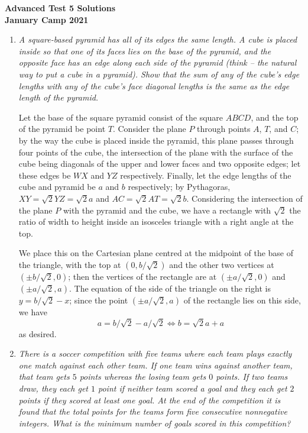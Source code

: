 \documentclass{article}
\begin{document}
\thispagestyle{empty}

\begin{center}
  \textbf{\Large Advanced Test 5 Solutions}
  \\ \vspace{1em}
  \textbf{\large January Camp 2021}
\end{center}

\vspace{12pt}

\begin{enumerate}[1.]

\item %
{\itshape A square-based pyramid has all of its edges the same length.
A cube is placed inside so that one of its faces lies on the base of the pyramid, and the opposite face has an edge along each side of the pyramid (think -- the natural way to put a cube in a pyramid).
Show that the sum of any of the cube's edge lengths with any of the cube's face diagonal lengths is the same as the edge length of the pyramid.}

Let the base of the square pyramid consist of the square $ABCD$, and the top of the pyramid be point $T$.
Consider the plane $P$ through points $A$, $T$, and $C$; by the way the cube is placed inside the pyramid, this plane passes through four points of the cube, the intersection of the plane with the surface of the cube being diagonals of the upper and lower faces and two opposite edges; let these edges be $WX$ and $YZ$ respectively.
Finally, let the edge lengths of the cube and pyramid be $a$ and $b$ respectively; by Pythagoras, $XY = \sqrt{2} YZ = \sqrt{2} a$ and $AC = \sqrt{2} AT = \sqrt{2} b$.
Considering the intersection of the plane $P$ with the pyramid and the cube, we have a rectangle with $\sqrt{2}$ the ratio of width to height inside an isosceles triangle with a right angle at the top.

We place this on the Cartesian plane centred at the midpoint of the base of the triangle, with the top at $(0,b/\sqrt{2})$ and the other two vertices at $(\pm b/\sqrt{2},0)$; then the vertices of the rectangle are at $(\pm a/\sqrt{2},0)$ and $(\pm a/\sqrt{2},a)$.
The equation of the side of the triangle on the right is $y = b/\sqrt{2} -x$; since the point $(\pm a/\sqrt{2},a)$ of the rectangle lies on this side, we have
\[ a = b/\sqrt{2} -a/\sqrt{2} \iff b = \sqrt{2} a + a \]
as desired.


\item %
{\itshape There is a soccer competition with five teams where each team plays exactly one match against each other team.
If one team wins against another team, that team gets $5$ points whereas the losing team gets $0$ points.
If two teams draw, they each get $1$ point if neither team scored a goal and they each get $2$ points if they scored at least one goal.
At the end of the competition it is found that the total points for the teams form five consecutive nonnegative integers.
What is the minimum number of goals scored in this competition?}



\end{enumerate}
\end{document}
